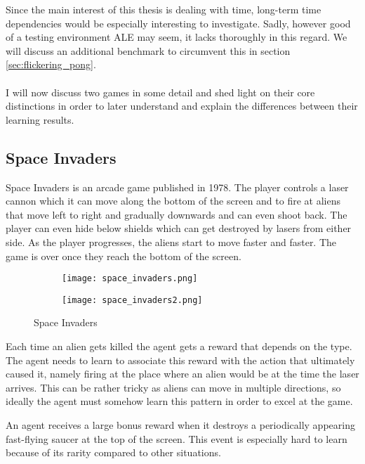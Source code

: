 Since the main interest of this thesis
is dealing with time,
long-term time dependencies would be especially interesting to investigate.
Sadly, however good of a testing environment ALE may seem,
it lacks thoroughly in this regard.
We will discuss an additional benchmark
to circumvent this in section
\ref{sec:flickering_pong}.

\paragraph{}
I will now discuss two games in some detail
and shed light on their core distinctions
in order to later understand and explain
the differences between their learning results.

\subsection{Space Invaders}
\label{sub:space_invaders}
Space Invaders is an arcade game published in 1978.
The player controls a laser cannon
which it can move along the bottom of the screen
and to fire at aliens that move left to right and gradually downwards
and can even shoot back.
The player can even hide below shields
which can get destroyed by lasers from either side.
As the player progresses,
the aliens start to move faster and faster.
The game is over
once they reach the bottom of the screen.

\begin{figure}[htpb]
  \centering
  \begin{subfigure}[t]{.49\textwidth}
    \texttt{[image: space\_invaders.png]}
  \end{subfigure}
  \begin{subfigure}[t]{.49\textwidth}
    \texttt{[image: space\_invaders2.png]}
  \end{subfigure}
  \caption{Space Invaders}
  \label{fig:space_invaders}
\end{figure}

Each time an alien gets killed the agent gets a reward
that depends on the type.
The agent needs to learn to associate this reward
with the action that ultimately caused it,
namely firing at the place where an alien would be
at the time the laser arrives.
This can be rather tricky as aliens
can move in multiple directions,
so ideally the agent must somehow learn this pattern
in order to excel at the game.

An agent receives a large bonus reward
when it destroys a periodically appearing fast-flying saucer
at the top of the screen.
This event is especially hard to learn because
of its rarity compared to other situations.


